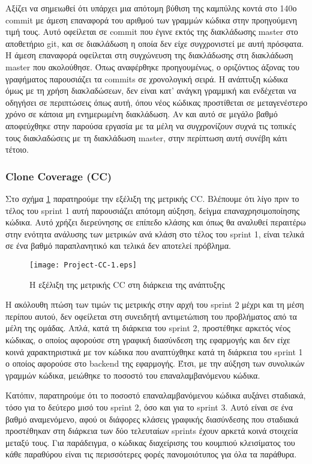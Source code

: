 Αξίζει να σημειωθεί ότι υπάρχει μια απότομη βύθιση της καμπύλης
κοντά στο 140ο commit με άμεση επαναφορά του αριθμού των γραμμών
κώδικα στην προηγούμενη τιμή τους. Αυτό οφείλεται σε commit που
έγινε εκτός της διακλάδωσης master στο αποθετήριο git, και σε
διακλάδωση η οποία δεν είχε συγχρονιστεί με αυτή πρόσφατα. Η
άμεση επαναφορά οφείλεται στη συγχώνευση της διακλάδωσης στη
διακλάδωση master που ακολούθησε. Όπως αναφέρθηκε προηγουμένως, ο
οριζόντιος άξονας του γραφήματος παρουσιάζει τα commits σε
χρονολογική σειρά. Η ανάπτυξη κώδικα όμως με τη χρήση
διακλαδώσεων, δεν είναι κατ’ ανάγκη γραμμική και ενδέχεται να
οδηγήσει σε περιπτώσεις όπως αυτή, όπου νέος κώδικας προστίθεται
σε μεταγενέστερο χρόνο σε κάποια μη ενημερωμένη διακλάδωση. Αν
και αυτό σε μεγάλο βαθμό αποφεύχθηκε στην παρούσα εργασία με τα
μέλη να συγχρονίζουν συχνά τις τοπικές τους διακλαδώσεις με τη
διακλάδωση master, στην περίπτωση αυτή συνέβη κάτι τέτοιο.

\subsubsection{Clone Coverage (CC)}

Στο σχήμα \ref{fig:projectCC} παρατηρούμε την εξέλιξη της μετρικής CC.
Βλέπουμε ότι λίγο πριν το τέλος του sprint 1 αυτή παρουσιάζει απότομη
αύξηση, δείγμα επαναχρησιμοποίησης κώδικα. Αυτό χρήζει διερεύνησης σε
επίπεδο κλάσης και όπως θα αναλυθεί περαιτέρω στην ενότητα ανάλυσης των
μετρικών ανά κλάση στο τέλος του sprint 1, είναι τελικά σε ένα βαθμό
παραπλανητικό και τελικά δεν αποτελεί πρόβλημα.

\begin{figure}
\centering
\texttt{[image: Project-CC-1.eps]}
\caption{Η εξέλιξη της μετρικής CC στη διάρκεια της ανάπτυξης}
\label{fig:projectCC}
\end{figure}

Η ακόλουθη πτώση των τιμών τις μετρικής στην αρχή του sprint 2 μέχρι
και τη μέση περίπου αυτού, δεν οφείλεται στη συνειδητή αντιμετώπιση
του προβλήματος από τα μέλη της ομάδας. Απλά, κατά τη διάρκεια του
sprint 2, προστέθηκε αρκετός νέος κώδικας, ο οποίος αφορούσε στη
γραφική διασύνδεση της εφαρμογής και δεν είχε κοινά χαρακτηριστικά
με τον κώδικα που αναπτύχθηκε κατά τη διάρκεια του sprint 1 ο οποίος
αφορούσε στο backend της εφαρμογής. Έτσι, με την αύξηση των
συνολικών γραμμών κώδικα, μειώθηκε το ποσοστό του επαναλαμβανόμενου
κώδικα.

Κατόπιν, παρατηρούμε ότι το ποσοστό επαναλαμβανόμενου κώδικα αυξάνει
σταδιακά, τόσο για το δεύτερο μισό του sprint 2, όσο και για το
sprint 3. Αυτό είναι σε ένα βαθμό αναμενόμενο, αφού οι διάφορες
κλάσεις γραφικής διασύνδεσης που σταδιακά προστέθηκαν στη διάρκεια
των δύο τελευταίων sprints έχουν αρκετά κοινά στοιχεία μεταξύ τους.
Για παράδειγμα, ο κώδικας διαχείρισης του κουμπιού κλεισίματος του
κάθε παραθύρου είναι τις περισσότερες φορές πανομοιότυπος για όλα τα
παράθυρα.

